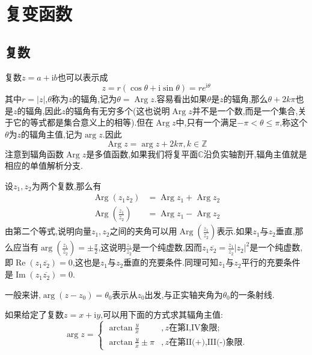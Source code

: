 \section{复变函数}
\subsection{复数}
复数$z=a+\mathrm{i}b$也可以表示成
$$
z=r(\cos\theta+\mathrm{i}\sin\theta)=re^{\mathrm{i}\theta}
$$
其中$r=|z|$,$\theta$称为$z$的辐角,记为$\theta=\operatorname{Arg}z$.容易看出如果$\theta$是$z$的辐角,那么$\theta+2k\pi$也是$z$的辐角,因此$z$的辐角有无穷多个(这也说明$\operatorname{Arg}z$并不是一个数,而是一个集合,关于它的等式都是集合意义上的相等).但在$\operatorname{Arg}z$中,只有一个满足$-\pi<\theta\leqslant \pi$,称这个$\theta$为$z$的辐角主值,记为$\arg z$.因此
$$
\operatorname{Arg}z=\arg z+2k\pi,k\in \mathbb{Z}
$$
注意到辐角函数$\operatorname{Arg}z$是多值函数,如果我们将复平面$\mathbb{C}$沿负实轴割开,辐角主值就是相应的单值解析分支.\par
设$z_1,z_2$为两个复数,那么有
$$
\begin{aligned}
    \operatorname{Arg}(z_1z_2)&=\operatorname{Arg}z_1+\operatorname{Arg}z_2\\
    \operatorname{Arg}\left(\frac{z_1}{z_2}\right)&=\operatorname{Arg}z_1-\operatorname{Arg}z_2
\end{aligned}
$$
由第二个等式,说明向量$z_1,z_2$之间的夹角可以用$\operatorname{Arg}\left(\frac{z_1}{z_2}\right)$表示.如果$z_1$与$z_2$垂直,那么应当有$\arg\left(\frac{z_1}{z_2}\right)=\pm\frac{\pi}{2}$,这说明$\frac{z_1}{z_2}$是一个纯虚数,因而$z_1\overline{z_2}=\frac{z_1}{z_2}|z_2|^2$是一个纯虚数,即$\operatorname{Re} (z_1\overline{z_2})=0$,这也是$z_1$与$z_2$垂直的充要条件.同理可知$z_1$与$z_2$平行的充要条件是$\operatorname{Im} (z_1\overline{z_2})=0$.\par
一般来讲,$\arg (z-z_0)=\theta_0$表示从$z_0$出发,与正实轴夹角为$\theta_0$的一条射线.\par
如果给定了复数$z=x+\mathrm{i}y$,可以用下面的方式求其辐角主值:
$$
\arg z=
\begin{cases}
    \arctan\frac{y}{x}&,z\text{在第I,IV象限};\\
    \arctan\frac{y}{x}\pm \pi&,z\text{在第II(+),III(-)象限}.
\end{cases}
$$

